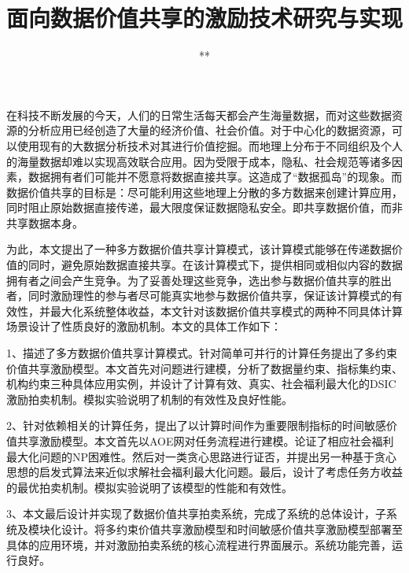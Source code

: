 \documentclass[promaster]{thesis-uestc}
\title{面向数据价值共享的激励技术研究与实现}{The Study and Implementation of Incentive Techniques for Value-based Data Sharing}
\author{**}{**}
\begin{document}
\makecover

\originalitydeclaration

\begin{chineseabstract}

在科技不断发展的今天，人们的日常生活每天都会产生海量数据，而对这些数据资源的分析应用已经创造了大量的经济价值、社会价值。对于中心化的数据资源，可以使用现有的大数据分析技术对其进行价值挖掘。而地理上分布于不同组织及个人的海量数据却难以实现高效联合应用。因为受限于成本，隐私、社会规范等诸多因素，数据拥有者们可能并不愿意将数据直接共享。这造成了“数据孤岛”的现象。而数据价值共享的目标是：尽可能利用这些地理上分散的多方数据来创建计算应用，同时阻止原始数据直接传递，最大限度保证数据隐私安全。即共享数据价值，而非共享数据本身。

为此，本文提出了一种多方数据价值共享计算模式，该计算模式能够在传递数据价值的同时，避免原始数据直接共享。在该计算模式下，提供相同或相似内容的数据拥有者之间会产生竞争。为了妥善处理这些竞争，选出参与数据价值共享的胜出者，同时激励理性的参与者尽可能真实地参与数据价值共享，保证该计算模式的有效性，并最大化系统整体收益，本文针对该数据价值共享模式的两种不同具体计算场景设计了性质良好的激励机制。本文的具体工作如下：

1、描述了多方数据价值共享计算模式。针对简单可并行的计算任务提出了多约束价值共享激励模型。本文首先对问题进行建模，分析了数据量约束、指标集约束、机构约束三种具体应用实例，并设计了计算有效、真实、社会福利最大化的DSIC激励拍卖机制。模拟实验说明了机制的有效性及良好性能。

2、针对依赖相关的计算任务，提出了以计算时间作为重要限制指标的时间敏感价值共享激励模型。本文首先以AOE网对任务流程进行建模。论证了相应社会福利最大化问题的NP困难性。然后对一类贪心思路进行证否，并提出另一种基于贪心思想的启发式算法来近似求解社会福利最大化问题。最后，设计了考虑任务方收益的最优拍卖机制。模拟实验说明了该模型的性能和有效性。

3、本文最后设计并实现了数据价值共享拍卖系统，完成了系统的总体设计，子系统及模块化设计。将多约束价值共享激励模型和时间敏感价值共享激励模型部署至具体的应用环境，并对激励拍卖系统的核心流程进行界面展示。系统功能完善，运行良好。


\end{chineseabstract}
\end{document}
